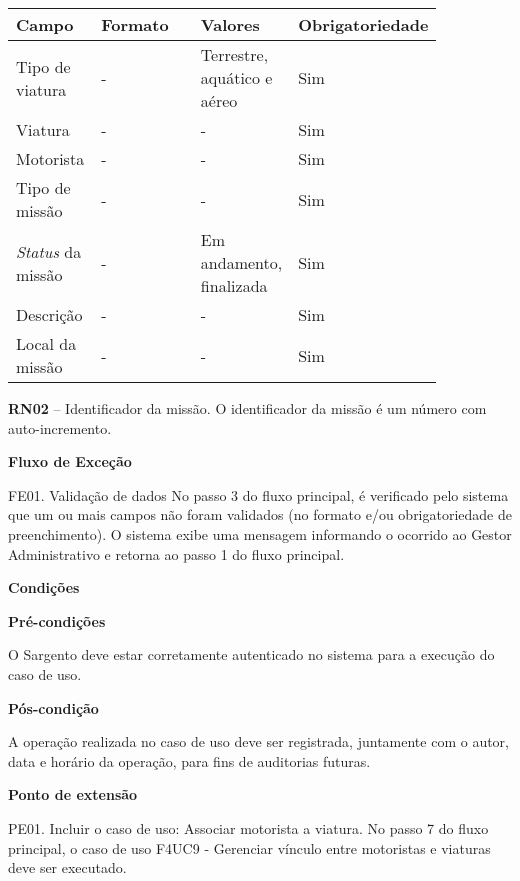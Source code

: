    \begin{table*}[!h]
    \centering
      \begin{tabular}{|p{0.20\linewidth}|p{0.25\linewidth}|p{0.20\linewidth}|p{0.20\linewidth}|}
      \hline
      Campo  & Formato & Valores & Obrigatoriedade\\
      \hline

      Tipo de viatura & - & Terrestre, aquático e aéreo & Sim\\ \hline

      Viatura & - & - & Sim\\\hline
      
      Motorista & - & - & Sim\\\hline
      
      Tipo de missão & - & - & Sim\\\hline
      
      \textit{Status} da missão & - & Em andamento, finalizada & Sim\\\hline
      
      Descrição & - & - & Sim\\\hline
      
      Local da missão & - & - & Sim\\\hline
      
      \hline
      \end{tabular}
    \end{table*}

    \textbf{RN02} – Identificador da missão.
    O identificador da missão é um número com auto-incremento.
    
   {\raggedright
      \textbf{Fluxo de Exceção}
   }
   
   FE01. Validação de dados
	No passo 3 do fluxo principal, é verificado pelo sistema que um ou mais campos não foram validados (no formato e/ou
	obrigatoriedade de preenchimento). O sistema exibe uma mensagem informando o ocorrido ao Gestor Administrativo e retorna
	ao passo 1 do fluxo principal.

	
   {\raggedright
      \textbf{Condições}
   }
   
    
   \textbf{Pré-condições}
   
   O Sargento deve estar corretamente autenticado no sistema para a execução do caso de uso.
   
   \textbf{Pós-condição}
   
   A operação realizada no caso de uso deve ser registrada, juntamente com o autor, data e horário da operação, para fins de auditorias futuras.
   
   \textbf{Ponto de extensão}
   
   PE01. Incluir o caso de uso: Associar motorista a viatura.
   No passo 7 do fluxo principal, o caso de uso F4UC9 - Gerenciar vínculo entre motoristas e viaturas deve ser executado.